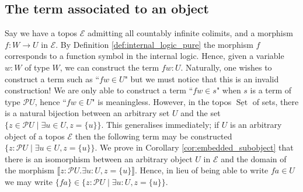 \documentclass{tac}
\newcommand{\call}[1]{\mathcal{#1}}
\newcommand{\lto}{\longrightarrow}
\begin{document}
	\subsection{The term associated to an object}\label{sec:object_term}
	Say we have a topos $\call{E}$ admitting all countably infinite colimits, and a morphism $f: W \lto U$ in $\call{E}$. By Definition \ref{def:internal_logic_pure} the morphism $f$ corresponds to a function symbol in the internal logic. Hence, given a variable $w:W$ of type $W$, we can construct the term $fw:U$. Naturally, one wishes to construct a term such as ``$fw \in U$" but we must notice that this is an invalid construction! We are only able to construct a term ``$fw \in s$" when $s$ is a term of type $\call{P}U$, hence ``$fw \in U$" is meaningless. However, in the topos $\underline{\operatorname{Set}}$ of sets, there is a natural bijection between an arbitrary set $U$ and the set $\lbrace z \in \call{P}U \mid \exists u \in U, z = \lbrace u \rbrace \rbrace$. This generalises immediately; if $U$ is an arbitrary object of a topos $\call{E}$ then the following term may be constructed $\lbrace z: \call{P}U \mid \exists u \in U, z = \lbrace u \rbrace \rbrace$. We prove in Corollary \ref{cor:embedded_subobject} that there is an isomorphism between an arbitrary object $U$ in $\call{E}$ and the domain of the morphism $\llbracket z: \call{P}U. \exists u:U, z = \lbrace u \rbrace \rrbracket$.  Hence, in lieu of being able to write $fa \in U$ we may write $\lbrace fa\rbrace \in \lbrace z: \call{P}U \mid \exists u : U, z = \lbrace u \rbrace \rbrace$.
	
\end{document}
